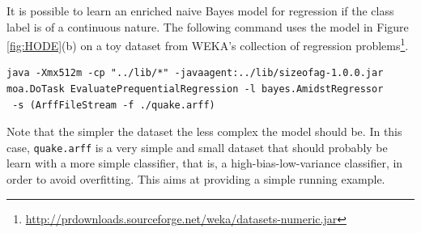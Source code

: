 It is possible to learn an enriched naive Bayes model for regression if the class label is of a continuous nature. The following command uses the model in Figure \ref{fig:HODE}(b) on a toy dataset from WEKA's collection of regression problems\footnote{\url{http://prdownloads.sourceforge.net/weka/datasets-numeric.jar}}.

\begin{verbatim}
java -Xmx512m -cp "../lib/*" -javaagent:../lib/sizeofag-1.0.0.jar 
moa.DoTask EvaluatePrequentialRegression -l bayes.AmidstRegressor
 -s (ArffFileStream -f ./quake.arff)
\end{verbatim}

Note that the simpler the dataset the less complex the model should be. In this case, \texttt{quake.arff} is a very simple and small dataset that should probably be learn with a more simple classifier, that is, a high-bias-low-variance classifier, in order to avoid overfitting. This aims at providing a simple running example.

